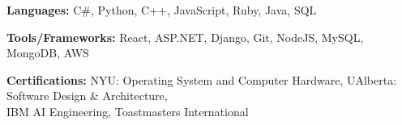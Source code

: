 
\begin{siderulesSos}
\begin{skillSection}
\cvskillentry
    {
      \begin{cvsositems}
        \item {\color{black}\textbf{Languages:} C\#, Python, C++, JavaScript, Ruby, Java, SQL}
        \item {\color{black}\textbf{Tools/Frameworks:} React, ASP.NET, Django, Git, NodeJS, MySQL, MongoDB, AWS}
        \item {\color{black}\textbf{Certifications:} NYU: Operating System and Computer Hardware, UAlberta: Software Design \& Architecture, \\ \hphantom{Certifications$>$}
                                                    IBM AI Engineering, Toastmasters International}
      \end{cvsositems}
    }
\end{skillSection}
\end{siderulesSos}